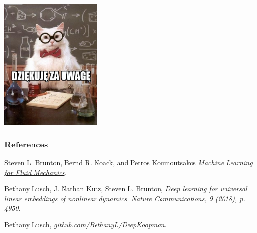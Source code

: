 \documentclass[aspectratio=169]{beamer}
\begin{document}
	
	
	\begin{frame}
		\begin{center}
			\includegraphics[width=5cm]{imgs/dziekuje.jpg}
		\end{center}
	\end{frame}
	
	\begin{frame}[allowframebreaks]
		\frametitle{References}
\begin{thebibliography}{9}
	
	Steven L. Brunton, Bernd R. Noack, and Petros Koumoutsakos
	\textit{\href{https://www.annualreviews.org/doi/abs/10.1146/annurev-fluid-010719-060214}{Machine Learning for Fluid Mechanics}}. 
	
	Bethany Lusch, J. Nathan Kutz, Steven L. Brunton, 
	\textit{\href{https://doi.org/10.1038/s41467-018-07210-0}{Deep learning for universal linear embeddings of nonlinear dynamics}. Nature Communications, 9 (2018), p. 4950.} 
	
	Bethany Lusch, 
	\textit{\href{github.com/BethanyL/DeepKoopman}{github.com/BethanyL/DeepKoopman}.} 
	
	
	 
	
%	
\end{thebibliography}
	\end{frame}
	


	
\end{document}
